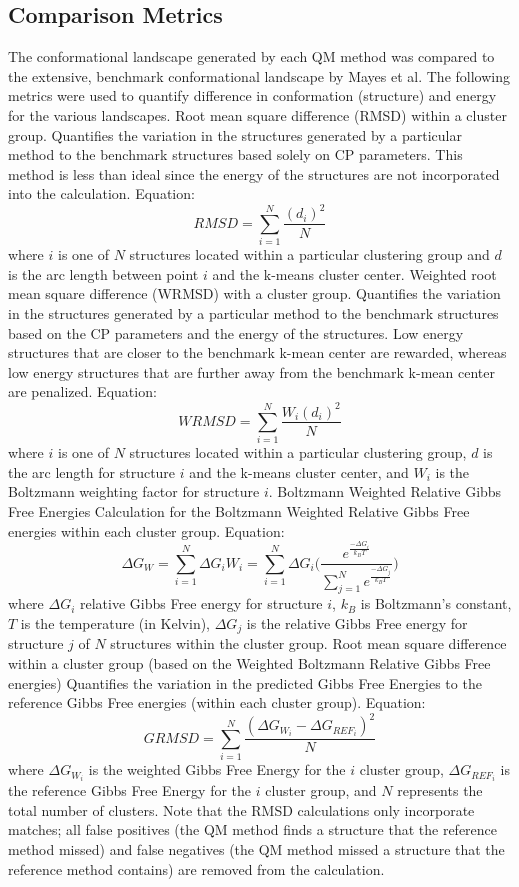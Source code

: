\documentclass{article}
\begin{document}
\subsection{Comparison Metrics}
\begin{outline}[enumerate]
The conformational landscape generated by each QM method was compared to the extensive, benchmark conformational 
landscape by Mayes et al. The following metrics were used to quantify difference in conformation (structure) and energy for 
the various landscapes.
\1 Root mean square difference (RMSD) within a cluster group.
	\2 Quantifies the variation in the structures generated by a particular method to the benchmark structures based solely 
	on CP parameters. This method is less than ideal since the energy of the structures are not incorporated into
	the calculation. 
	\2 Equation:
	$$
		RMSD=\sum_{i=1}^{N} \frac{(d_i)^2}{N}
	$$
	where $i$ is one of $N$  structures located within a particular clustering group and $d$ is the arc length between point $i$
	and the k-means cluster center. 
\1 Weighted root mean square difference (WRMSD) with a cluster group.
	\2 Quantifies the variation in the structures generated by a particular method to the benchmark structures based on the CP
	parameters and the energy of the structures. Low energy structures that are closer to the benchmark k-mean center 
	are rewarded, whereas low energy structures that are further away from the benchmark k-mean center are penalized. 
	\2 Equation: 
	$$
		WRMSD=\sum_{i=1}^{N} \frac{W_i(d_i)^2}{N}
	$$
	where $i$ is one of $N$  structures located within a particular clustering group, $d$ is the arc length for structure $i$
	and the k-means cluster center, and $W_i$ is the Boltzmann weighting factor for structure $i$.
\1 Boltzmann Weighted Relative Gibbs Free Energies
	\2 Calculation for the Boltzmann Weighted Relative Gibbs Free energies within each cluster group.
	\2 Equation:
	$$
		\Delta G_W = \sum_{i=1}^{N} \Delta G_i W_i =  \sum_{i=1}^{N} \Delta G_i \Bigg(\frac{e^{\frac{-\Delta G_i}{k_B T}}}{\sum_{j=1}^{N}e^{\frac{-\Delta G_j}{k_B T}}}\Bigg)
	$$
	where $\Delta G_i$ relative Gibbs Free energy for structure $i$, $k_B$ is Boltzmann's constant, $T$ is the temperature (in Kelvin), 
	$\Delta G_j$ is the relative Gibbs Free energy for structure $j$ of $N$ structures within the cluster group. 
\1 Root mean square difference within a cluster group (based on the Weighted Boltzmann Relative Gibbs Free energies)
	\2 Quantifies the variation in the predicted Gibbs Free Energies to the reference Gibbs Free energies (within each cluster group).    
	\2 Equation: 
	$$ 
		GRMSD=\sum_{i=1}^{N} \frac{(\Delta G_{W_i} - \Delta G_{REF_i})^2}{N}
	$$ 
	where $\Delta G_{W_i}$ is the weighted Gibbs Free Energy for the $i$ cluster group, $\Delta G_{REF_i}$ is the reference Gibbs Free
	Energy for the $i$ cluster group, and $N$ represents the total number of clusters. Note that the RMSD calculations only incorporate 
	matches; all false positives (the QM method finds a structure that the reference method missed) and false negatives (the QM method
	missed a structure that the reference method contains) are removed from the calculation. 	
\end{outline}
\end{document}
